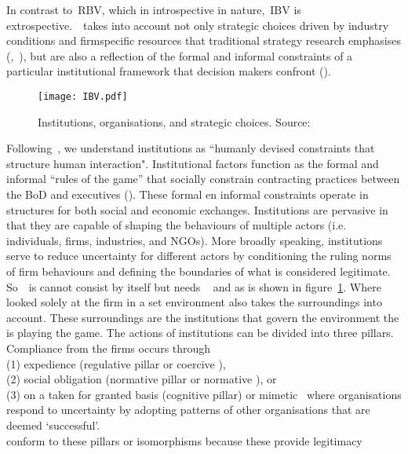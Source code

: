 In contrast to~\gls{RBV}, which in introspective in nature,~\gls{IBV} is extrospective.~\ibv~takes into 
account not only strategic choices driven by industry conditions and firm\-specific resources that 
traditional strategy research emphasises (\cite{Porter:1980},~\cite{Barney:1991}), but are also a 
reflection of the formal and informal constraints of a particular institutional framework that decision
makers confront (\cite{Oliver:1997,Scott:1995}). \\

\begin{figure}[htbp!] 
	\centering
	\texttt{[image: IBV.pdf]}
 	\caption{Institutions, organisations, and strategic choices.
Source: \cite{Peng:2000}}
	\label{fig:ibv}
\end{figure}

Following~\cite{North:1990}, we understand institutions as ``humanly devised constraints
that structure human interaction". Institutional factors function as the formal and
informal ``rules of the game'' that socially constrain contracting practices between the \gls{BoD} and 
executives (\cite{North:1990}).  
These formal en informal constraints operate in structures for both social and economic exchanges. 
Institutions are pervasive in that they are capable of shaping the behaviours of multiple actors (i.e. 
individuals, firms, industries, and \glspl{NGO}). More broadly speaking, institutions serve to reduce 
uncertainty for different actors by conditioning the ruling norms of firm behaviours and defining the 
boundaries of what is considered legitimate.~\cite{Peng:2008}\\

So~\ibv~is cannot consist by itself but needs \rbv~\cite{Barney:1991} and \cite{Porter:1980} as is shown in figure~\ref{fig:ibv}. 
Where \rbv looked solely at the firm in a set environment \ibv also takes the surroundings into account. These surroundings are the institutions that govern the environment the \mne is playing the game. 
The actions of institutions can be divided into three pillars. Compliance from the firms occurs through \\(1) expedience (regulative pillar or coercive \iso),\\
 (2) social obligation (normative pillar or normative \iso), or \\
 (3) on a taken for granted basis (cognitive pillar) or mimetic \iso~where organisations respond to uncertainty by adopting patterns of other organisations that are deemed `successful'\cite{Westney:2005,Peng:2008,Kostova:1999,DiMaggio:1983,Scott:1995}.\\ 
\mne conform to these pillars or isomorphisms because these provide legitimacy~\cite{Powell:1991}

